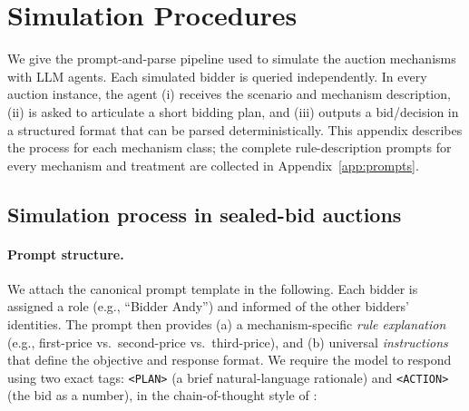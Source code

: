\section{Simulation Procedures}\label{app:procedures}

We give the prompt-and-parse pipeline used to simulate the auction mechanisms with LLM agents. Each simulated bidder is queried independently. In every auction instance, the agent (i) receives the scenario and mechanism description, (ii) is asked to articulate a short bidding plan, and (iii) outputs a bid/decision in a structured format that can be parsed deterministically. This appendix describes the process for each mechanism class; the complete rule-description prompts for every mechanism and treatment are collected in Appendix~\ref{app:prompts}.

\subsection{Simulation process in sealed-bid auctions}\label{app:sealed-process}

\paragraph{Prompt structure.}
We attach the canonical prompt template in the following. Each bidder is assigned a role (e.g., ``Bidder Andy'') and informed of the other bidders' identities. The prompt then provides (a) a mechanism-specific \emph{rule explanation} (e.g., first-price vs.\ second-price vs.\ third-price), and (b) universal \emph{instructions} that define the objective and response format. We require the model to respond using two exact tags: \verb|<PLAN>| (a brief natural-language rationale) and \verb|<ACTION>| (the bid as a number), in the chain-of-thought style of \citet{wei2022chain}:

